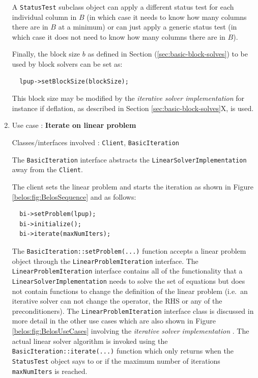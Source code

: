 \documentclass[pdf,ps2pdf,11pt]{SANDreport}
\begin{document}
\begin{enumerate}
A {}\texttt{Status\-Test} subclass object can apply a different status
test for each individual column in $B$ (in which case it needs to know
how many columns there are in $B$ at a minimum) or can just apply a
generic status test (in which case it does not need to know how many
columns there are in $B$).

Finally, the block size $b$ as defined in Section
(\ref{sec:basic-block-solves}) to be used by block solvers can be set
as:

{\scriptsize\begin{verbatim}
  lpup->setBlockSize(blockSize);
\end{verbatim}}

This block size may be modified by the {}\textit{iterative solver
implementation} for instance if deflation, as described in Section
{}\ref{sec:basic-block-solves}X, is used.

{}\item Use case : \textbf{Iterate on linear problem}

{}\noindent{}Classes/interfaces involved : {}\texttt{Client},
{}\texttt{Basic\-Iteration}

The {}\texttt{Basic\-Iteration} interface abstracts the
{}\texttt{Linear\-Solver\-Implementation} away from the
{}\texttt{Client}.

The client sets the linear problem and starts the iteration as shown
in Figure {}\ref{belos:fig:BelosSequence} and as follows:

{\scriptsize\begin{verbatim}
  bi->setProblem(lpup);
  bi->initialize();
  bi->iterate(maxNumIters);
\end{verbatim}}

The {}\texttt{Basic\-Iteration::\-set\-Problem(...)} function accepts
a linear problem object through the
{}\texttt{Linear\-Problem\-Iteration} interface.  The
{}\texttt{Linear\-Problem\-Iteration} interface contains all of the
functionality that a {}\texttt{Linear\-Solver\-Implementation} needs
to solve the set of equations but does not contain functions to change
the definition of the linear problem (i.e.~an iterative solver can not
change the operator, the RHS or any of the preconditioners).  The
{}\texttt{Linear\-Problem\-Iteration} interface class is discussed in
more detail in the other use cases which are also shown in Figure
{}\ref{belos:fig:BelosUseCases} involving the {}\textit{iterative
solver implementation} .  The actual linear solver algorithm is
invoked using the {}\texttt{Basic\-Iteration::\-iterate(...)} function
which only returns when the {}\texttt{Status\-Test} object says to or
if the maximum number of iterations {}\texttt{maxNumIters} is reached.


\end{enumerate}
\end{document}
